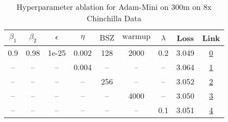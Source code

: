 \begin{table}[H]
\centering
\caption{Hyperparameter ablation for Adam-Mini on 300m on 8x Chinchilla Data}
\label{tab:ablation_adam-mini_300m_8}
\begin{tabular}{ccccccccc}
\toprule
$\beta_1$ & $\beta_2$ & $\epsilon$ & $\eta$ & $\mathrm{BSZ}$ & $\mathrm{warmup}$ & $\lambda$ & Loss & Link \\
\midrule
0.9 & 0.98 & 1e-25 & 0.002 & 128 & 2000 & 0.2 & 3.049 & \href{https://wandb.ai/stanford-mercury/optimizer-scaling/runs/sweep-300m-48B-minic8695flr0.002-wd0.2-minlr0-warmup2000-b10.9-b-952cc4}{0} \\
\midrule
-- & -- & -- & 0.004 & -- & -- & -- & 3.064 & \href{https://wandb.ai/stanford-mercury/optimizer-scaling/runs/sweep-300m-48B-minid13807lr0.004-wd0.2-minlr0-warmup2000-b10.9-b-c8b391}{1} \\
-- & -- & -- & -- & 256 & -- & -- & 3.052 & \href{https://wandb.ai/stanford-mercury/optimizer-scaling/runs/sweep-300m-48B-mini54b665lr0.002-wd0.2-minlr0-warmup2000-b10.9-b-bb57bb}{2} \\
-- & -- & -- & -- & -- & 4000 & -- & 3.050 & \href{https://wandb.ai/stanford-mercury/optimizer-scaling/runs/sweep-300m-48B-mini8ec643lr0.002-wd0.2-minlr0-warmup4000-b10.9-b-efe5ba}{3} \\
-- & -- & -- & -- & -- & -- & 0.1 & 3.051 & \href{https://wandb.ai/stanford-mercury/optimizer-scaling/runs/sweep-300m-48B-mini293878lr0.002-wd0.1-minlr0-warmup2000-b10.9-b-f38163}{4} \\
\bottomrule
\end{tabular}
\end{table}

